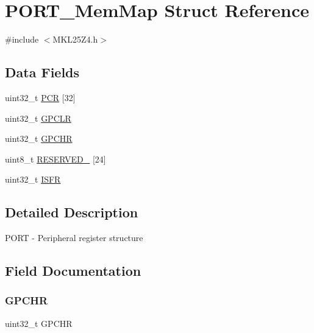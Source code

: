 \hypertarget{struct_p_o_r_t___mem_map}{}\section{P\+O\+R\+T\+\_\+\+Mem\+Map Struct Reference}
\label{struct_p_o_r_t___mem_map}


{\ttfamily \#include $<$M\+K\+L25\+Z4.\+h$>$}

\subsection*{Data Fields}
\begin{DoxyCompactItemize}
\item 
uint32\+\_\+t \hyperlink{struct_p_o_r_t___mem_map_ad806aad894fe96382a78c6119527d0e8}{P\+CR} \mbox{[}32\mbox{]}
\item 
uint32\+\_\+t \hyperlink{struct_p_o_r_t___mem_map_a6e7a9e797813e20f3c1719d92158e1c9}{G\+P\+C\+LR}
\item 
uint32\+\_\+t \hyperlink{struct_p_o_r_t___mem_map_afad5aeb555260e7012ee2201815668a2}{G\+P\+C\+HR}
\item 
uint8\+\_\+t \hyperlink{struct_p_o_r_t___mem_map_a33a1c574e559dc57bb2fc28166bf6341}{R\+E\+S\+E\+R\+V\+E\+D\+\_} \mbox{[}24\mbox{]}
\item 
uint32\+\_\+t \hyperlink{struct_p_o_r_t___mem_map_a5c88289be439e694726a8c11ae0059fc}{I\+S\+FR}
\end{DoxyCompactItemize}


\subsection{Detailed Description}
P\+O\+RT -\/ Peripheral register structure 

\subsection{Field Documentation}
\mbox{\label{struct_p_o_r_t___mem_map_afad5aeb555260e7012ee2201815668a2}} 
\subsubsection{\texorpdfstring{G\+P\+C\+HR}{GPCHR}}
{\footnotesize\ttfamily uint32\+\_\+t G\+P\+C\+HR}

